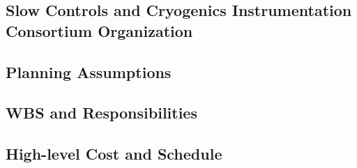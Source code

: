 
\subsection{Slow Controls and Cryogenics Instrumentation Consortium Organization}
\label{sec:fdsp-slow-cryo-org-consortium}


\subsection{Planning Assumptions}
\label{sec:fdsp-slow-cryo-org-assmp}


\subsection{WBS and Responsibilities}
\label{sec:fdsp-slow-cryo-org-wbs}

\subsection{High-level Cost and Schedule}
\label{sec:fdsp-slow-cryo-org-cs}


